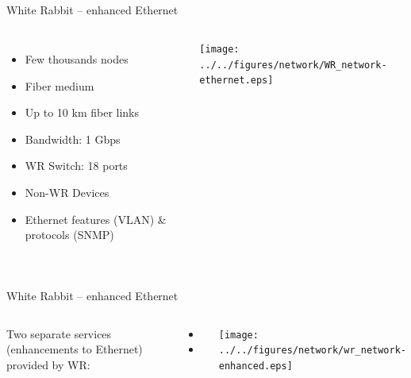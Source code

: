 \documentclass[compress,red]{beamer}
\begin{document}
\subsection{}
\begin{frame}{White Rabbit -- enhanced Ethernet}

\begin{columns}[c]
 

  \begin{itemize}
    \item Few thousands nodes
    \item Fiber medium
    \item Up to 10 km fiber links
    \item Bandwidth: 1 Gbps
    \item WR Switch: 18 ports
    \item Non-WR Devices
    \item Ethernet features (VLAN) \& protocols (SNMP)
  \end{itemize}

    \begin{center}
    \texttt{[image: ../../figures/network/WR\_network-ethernet.eps]}
    \end{center}
\end{columns}

\end{frame}
\subsection{}
\begin{frame}{White Rabbit -- enhanced Ethernet}


\begin{columns}[c]
 
  Two separate services (enhancements to Ethernet) provided by WR: 
  \begin{itemize}
    \item \color{blue!90}{High accuracy/precision synchronization}
    \item \color{red}{Deterministic, reliable and low-latency Control Data delivery}
  \end{itemize}

    \begin{center}
    \texttt{[image: ../../figures/network/wr\_network-enhanced.eps]}
    \end{center}
\end{columns}

\end{frame}
\end{document}
